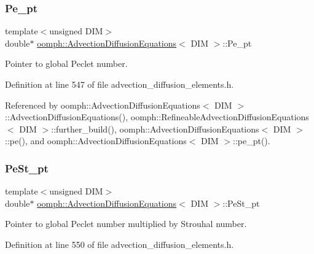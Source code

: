 \subsubsection{\texorpdfstring{Pe\+\_\+pt}{Pe\_pt}}
{\footnotesize\ttfamily template$<$unsigned D\+IM$>$ \\
double$\ast$ \hyperlink{classoomph_1_1AdvectionDiffusionEquations}{oomph\+::\+Advection\+Diffusion\+Equations}$<$ D\+IM $>$\+::Pe\+\_\+pt\hspace{0.3cm}{\ttfamily [protected]}}



Pointer to global Peclet number. 



Definition at line 547 of file advection\+\_\+diffusion\+\_\+elements.\+h.



Referenced by oomph\+::\+Advection\+Diffusion\+Equations$<$ D\+I\+M $>$\+::\+Advection\+Diffusion\+Equations(), oomph\+::\+Refineable\+Advection\+Diffusion\+Equations$<$ D\+I\+M $>$\+::further\+\_\+build(), oomph\+::\+Advection\+Diffusion\+Equations$<$ D\+I\+M $>$\+::pe(), and oomph\+::\+Advection\+Diffusion\+Equations$<$ D\+I\+M $>$\+::pe\+\_\+pt().

\mbox{\label{classoomph_1_1AdvectionDiffusionEquations_aa9368fa0d1bd18604c9482b14022502f}} 
\subsubsection{\texorpdfstring{Pe\+St\+\_\+pt}{PeSt\_pt}}
{\footnotesize\ttfamily template$<$unsigned D\+IM$>$ \\
double$\ast$ \hyperlink{classoomph_1_1AdvectionDiffusionEquations}{oomph\+::\+Advection\+Diffusion\+Equations}$<$ D\+IM $>$\+::Pe\+St\+\_\+pt\hspace{0.3cm}{\ttfamily [protected]}}



Pointer to global Peclet number multiplied by Strouhal number. 



Definition at line 550 of file advection\+\_\+diffusion\+\_\+elements.\+h.



